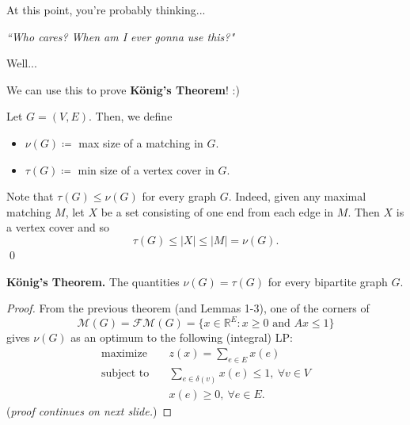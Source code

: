 \begin{frame}
\begin{center}
\Large At this point, you're probably thinking...
\end{center}
\end{frame}

\begin{frame}
\begin{center}
	\Large \emph{``Who cares? When am I ever gonna use this?"}
\end{center}
\end{frame}

\begin{frame}
\begin{center}
\Large Well...
\end{center}
\end{frame}

\begin{frame}
\begin{center}
	\Large We can use this to prove \alert{\textbf{K\"onig's Theorem}}! :)
\end{center}
\end{frame}

\begin{frame}
Let \( G = (V,E) \). Then, we define
\begin{itemize}
	\item<2-> \( \nu (G) \coloneqq  \) max size of a matching in \( G \).
	\item<3-> \( \tau (G) \coloneqq \) min size of a vertex cover in \( G \).
\end{itemize}
\vspace{0.3cm}
Note that \( \tau (G) \leq \nu (G) \) for every graph \( G \). Indeed, given any maximal matching \( M \), let \( X \) be a set consisting of one end from each edge in \( M \). Then \( X \) is a vertex cover and so \[ \tau (G) \leq |X| \leq |M| = \nu (G). \] \qed
\end{frame}

\begin{frame}
\textbf{K\"onig's Theorem.} The quantities \( \nu (G) = \tau (G) \) for every bipartite graph \( G \).
\begin{proof}\renewcommand{\qedsymbol}{}
	From the previous theorem (and Lemmas 1-3), one of the corners of \[ \mathcal{M} (G) = \mathcal{FM} (G) = \{ x \in \mathbb{R}^{E} : x \geq 0 \mbox{ and } Ax \leq 1 \} \] gives \( \nu (G) \) as an optimum to the following (integral) LP:
\begin{align*}
\text{maximize} \quad &z(x) = \sum_{e \in E}^{} x(e) \\
\text{subject to} \quad & \sum_{e \in \delta (v)}^{} x(e)  \leq 1, \ \forall v \in V \\
& x(e) \geq 0, \ \forall e \in E.
\end{align*}
(\emph{proof continues on next slide.})
\end{proof}
\end{frame}

